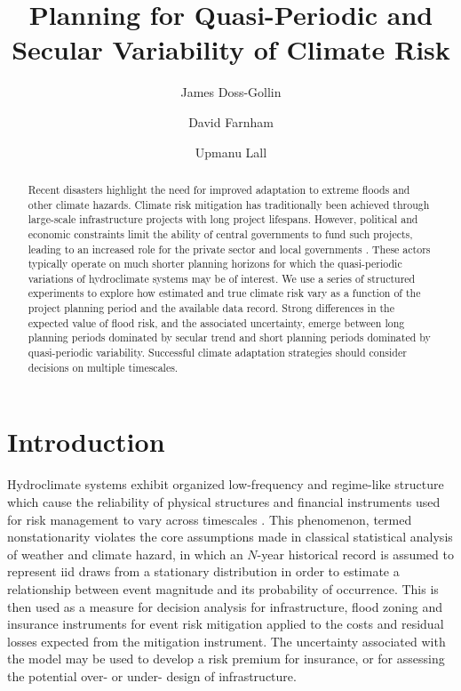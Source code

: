 \documentclass[12pt]{article}
\title{Planning for Quasi-Periodic and Secular Variability of Climate Risk}
\author[1,2]{James Doss-Gollin}
\author[1,2]{David Farnham}
\author[1,2]{Upmanu Lall}
\affil[1]{Columbia Water Center, Columbia University}
\affil[2]{Department of Earth and Environmental Engineering, Columbia University}
\begin{document}
\maketitle
\RaggedRight{}

\begin{abstract}
  Recent disasters highlight the need for improved adaptation to extreme floods and other climate hazards.
  Climate risk mitigation has traditionally been achieved through large-scale infrastructure projects with long project lifespans.
  However, political and economic constraints limit the ability of central governments to fund such projects, leading to an increased role for the private sector and local governments \citep{WorldEconomicForum2016}.
  These actors typically operate on much shorter planning horizons for which the quasi-periodic variations of hydroclimate systems may be of interest.
  We use a series of structured experiments to explore how estimated and true climate risk vary as a function of the project planning period and the available data record.
  Strong differences in the expected value of flood risk, and the associated uncertainty, emerge between long planning periods dominated by secular trend and short planning periods dominated by quasi-periodic variability.
  Successful climate adaptation strategies should consider decisions on multiple timescales.
\end{abstract}


\section{Introduction}\label{sec:introduction}

Hydroclimate systems exhibit organized low-frequency and regime-like structure which cause the reliability of physical structures and financial instruments used for risk management to vary across timescales \citep{Jain2001,Merz2014,Hannachi2017}.
This phenomenon, termed nonstationarity \citep{Milly2008} violates the core assumptions made in classical statistical analysis of weather and climate hazard, in which an $N$-year historical record is assumed to represent \gls{iid} draws from a stationary distribution in order to estimate a relationship between event magnitude and its probability of occurrence.
This is then used as a measure for decision analysis for infrastructure, flood zoning and insurance instruments for event risk mitigation applied to the costs and residual losses expected from the mitigation instrument.
The uncertainty associated with the model may be used to develop a risk premium for insurance, or for assessing the potential over- or under- design of infrastructure.
\end{document}
